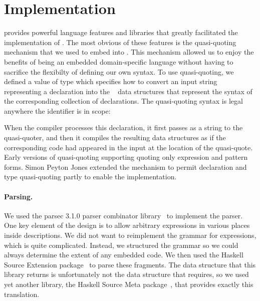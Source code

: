 \section{Implementation}
\label{sec:implementation}
\haskell{} provides powerful language features and libraries that
greatly facilitated the implementation of \forest{}.  The most obvious
of these features is the quasi-quoting~\cite{Mainland:quasi} mechanism
that we used to embed \forest{} into \haskell{}.  This mechanism
allowed us to enjoy the benefits of being an embedded domain-specific
language without having to sacrifice the flexibilty of
defining our own syntax. To use quasi-quoting, we defined a \haskell{}
value  of type  which specifies how to
convert an input string representing a \forest{} declaration into the
\template{}~\cite{Sheard+:templatehaskell} 
data structures that represent the syntax of the
corresponding collection of \haskell{} declarations.
The quasi-quoting syntax is legal anywhere the identifier  is in scope:
\begin{code}
\end{code}
When the \haskell{} compiler processes this declaration, it first
passes  as a string to the  quasi-quoter, and
then it compiles the resulting \template{} data structures as if the
corresponding \haskell{} code had appeared in the input at the
location of the quasi-quote.  Early versions of quasi-quoting
supporting quoting only expression and pattern forms.  Simon Peyton
Jones extended the mechanism to permit declaration and type
quasi-quoting partly to enable the \forest{} implementation.  

\paragraph{Parsing.}  
We used the parsec 3.1.0 parser
combinator library~\cite{LeijenMeijer:parsec} to implement the \forest{} parser.  One key element
of the \forest{} design is to allow arbitrary \haskell{} expressions
in various places inside \forest{} descriptions.  We did not want to
reimplement the grammar for \haskell{} expressions, which is quite
complicated.  Instead, we structured the \forest{} grammar so we could
always determine the extent of any embedded \haskell{} code.  We then
used the Haskell Source Extension package~\cite{haskell-src-exts} to parse
these fragments.  The data structure that this library returns is
unfortunately not the data structure that \template{} requires, so we
used yet another library, the Haskell Source Meta
package~\cite{haskell-src-meta}, that provides exactly this translation. 


